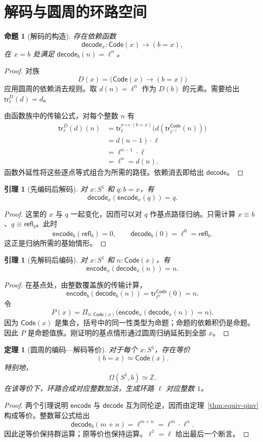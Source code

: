 \documentclass[12pt,oneside,openany,fontset=none]{ctexbook}
\theoremstyle{cn}
\newtheorem{lemma}[definition]{引理}
\newtheorem{proposition}[definition]{命题}
\newtheorem{theorem}[definition]{定理}
\numberwithin{equation}{chapter}
\newcommand{\refl}{\mathsf{refl}}
\newcommand{\tr}{\mathsf{tr}}
\newcommand{\Z}{\mathbb Z}
\begin{document}
\section{解码与圆周的环路空间}

\begin{proposition}[解码的构造]
存在依赖函数
\[
 \mathsf{decode}_x:\mathsf{Code}(x)\to(b=x),
\]
在 $x=b$ 处满足 $\mathsf{decode}_b(n)=\ell^n$。
\end{proposition}
\begin{proof}
对族
\[
 D(x)=\bigl(\mathsf{Code}(x)\to(b=x)\bigr)
\]
应用圆周的依赖消去规则。取 $d(n)=\ell^n$ 作为 $D(b)$ 的元素。需要给出 $\tr^D_\ell(d)=d$。

由函数族中的传输公式，对每个整数 $n$ 有
\begin{align*}
 \tr^D_\ell(d)(n)
 &=\tr^{x\mapsto(b=x)}_\ell
     \bigl(d(\tr^{\mathsf{Code}}_{\ell^{-1}}(n))\bigr)\\
 &=d(n-1)\cdot\ell\\
 &=\ell^{n-1}\cdot\ell\\
 &=\ell^n=d(n).
\end{align*}
函数外延性将这些逐点等式组合为所需的路径。依赖消去即给出 $\mathsf{decode}$。
\end{proof}

\begin{lemma}[先编码后解码]
对 $x:S^1$ 和 $q:b=x$，有
\[
 \mathsf{decode}_x(\mathsf{encode}_x(q))=q.
\]
\end{lemma}
\begin{proof}
这里的 $x$ 与 $q$ 一起变化，因而可以对 $q$ 作基点路径归纳。只需计算 $x\equiv b$、$q\equiv\refl_b$。此时
\[
 \mathsf{encode}_b(\refl_b)=0,
 \qquad
 \mathsf{decode}_b(0)=\ell^0=\refl_b.
\]
这正是归纳所需的基始情形。
\end{proof}

\begin{lemma}[先解码后编码]
对 $x:S^1$ 和 $n:\mathsf{Code}(x)$，有
\[
 \mathsf{encode}_x(\mathsf{decode}_x(n))=n.
\]
\end{lemma}
\begin{proof}
在基点处，由整数覆盖族的传输计算，
\[
 \mathsf{encode}_b(\mathsf{decode}_b(n))
 =\tr^{\mathsf{Code}}_{\ell^n}(0)=n.
\]
令
\[
 P(x)=\Pi_{n:\mathsf{Code}(x)}
 \bigl(\mathsf{encode}_x(\mathsf{decode}_x(n))=n\bigr).
\]
因为 $\mathsf{Code}(x)$ 是集合，括号中的同一性类型为命题；命题的依赖积仍是命题。因此 $P$ 是命题值族。刚证明的基点情形通过圆周归纳延拓到全部 $x$。
\end{proof}

\begin{theorem}[圆周的编码—解码等价]\label{thm:circle-encode}
对于每个 $x:S^1$，存在等价
\[
 (b=x)\simeq\mathsf{Code}(x).
\]
特别地，
\[
 \Omega(S^1,b)\simeq\Z.
\]
在该等价下，环路合成对应整数加法，生成环路 $\ell$ 对应整数 $1$。
\end{theorem}
\begin{proof}
两个引理说明 $\mathsf{encode}$ 与 $\mathsf{decode}$ 互为同伦逆，因而由定理~\ref{thm:equiv-qinv} 构成等价。整数幂公式给出
\[
 \mathsf{decode}_b(m+n)
 =\ell^{m+n}
 =\ell^m\cdot\ell^n.
\]
因此逆等价保持群运算；原等价也保持运算。$\ell^1=\ell$ 给出最后一个断言。
\end{proof}
\end{document}
